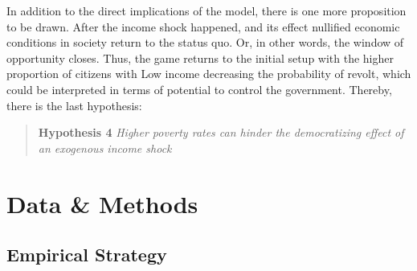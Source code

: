 \documentclass[a4paper, 12pt]{article}
\begin{document}
	\noindent In addition to the direct implications of the model, there is one more proposition to be drawn. After the income shock happened, and its effect nullified economic conditions in society return to the status quo. Or, in other words, the window of opportunity closes. Thus, the game returns to the initial setup with the higher proportion of citizens with Low income decreasing the probability of revolt, which could be interpreted in terms of potential to control the government. Thereby, there is the last hypothesis:
	
	\begin{quote}
	    \textbf{Hypothesis 4} \textit{Higher poverty rates can hinder the democratizing effect of an exogenous income shock}
	\end{quote}
	
	\section{Data \& Methods}

	\subsection{Empirical Strategy}
	
\end{document}
